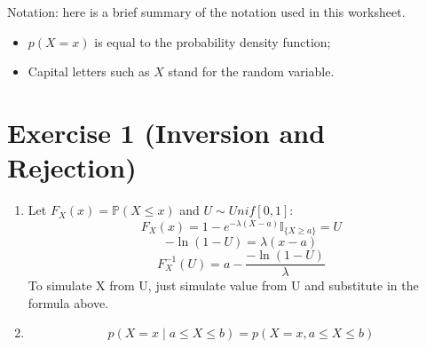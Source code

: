 \documentclass[12pt,letterpaper]{article}
\begin{document}
Notation: here is a brief summary of the notation used in this worksheet.
\begin{itemize}
\item $ p(X=x)$ is equal to the probability density function;
\item Capital letters such as $X$ stand for the random variable.
\end{itemize}

\section*{Exercise 1 (Inversion and Rejection)}
\begin{enumerate}[leftmargin=!,labelindent=5pt]
    \item Let $ F_X(x) = \mathbb{P}(X \leq x) $ and $U \sim Unif[0,1]$:
            $$ F_X(x) = 1 - e^{-\lambda(X-a)}\mathbb{I}_{\{X \geq a\}}=U $$
            $$ -\ln(1-U) = \lambda(x-a) $$
            $$ F_X^{-1}(U) = a - \frac{-\ln(1-U)}{\lambda} $$
    To simulate X from U, just simulate value from U and substitute in the
    formula above.
        
    \item
    $$p(X=x \mid a \leq X \leq b) = p(X=x, a \leq X \leq b)$$
\end{enumerate}

        
\end{document}
